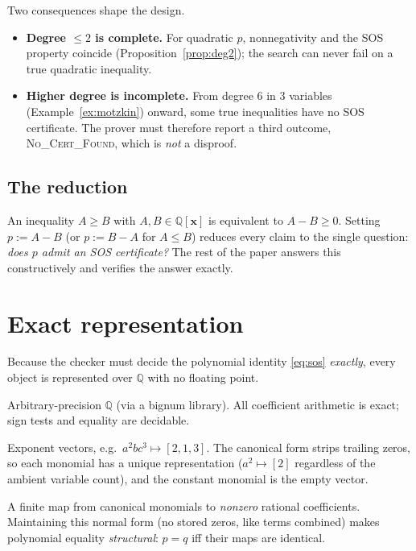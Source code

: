 \documentclass[11pt]{article}
\theoremstyle{definition}
\theoremstyle{plain}
\newcommand{\Q}{\mathbb{Q}}
\newcommand{\x}{\mathbf{x}}
\begin{document}
Two consequences shape the design.
\begin{itemize}[leftmargin=1.4em]
  \item \textbf{Degree $\le 2$ is complete.} For quadratic $p$, nonnegativity
        and the SOS property coincide (Proposition~\ref{prop:deg2}); the search
        can never fail on a true quadratic inequality.
  \item \textbf{Higher degree is incomplete.} From degree $6$ in $3$ variables
        (Example~\ref{ex:motzkin}) onward, some true inequalities have no SOS
        certificate. The prover must therefore report a third outcome,
        \textsc{No\_Cert\_Found}, which is \emph{not} a disproof.
\end{itemize}

\subsection{The reduction}

An inequality $A \ge B$ with $A,B \in \Q[\x]$ is equivalent to $A - B \ge 0$.
Setting $p := A - B$ (or $p := B - A$ for $A \le B$) reduces every claim to the
single question: \emph{does $p$ admit an SOS certificate?} The rest of the paper
answers this constructively and verifies the answer exactly.

\section{Exact representation}
\label{sec:representation}

Because the checker must decide the polynomial identity \eqref{eq:sos}
\emph{exactly}, every object is represented over $\Q$ with no floating point.

\begin{description}[leftmargin=0pt,style=nextline]
  \item[Rationals.] Arbitrary-precision $\Q$ (via a bignum library). All
    coefficient arithmetic is exact; sign tests and equality are decidable.
  \item[Monomials.] Exponent vectors, e.g.\ $a^2 b c^3 \mapsto [2,1,3]$. The
    canonical form strips trailing zeros, so each monomial has a unique
    representation ($a^2 \mapsto [2]$ regardless of the ambient variable count),
    and the constant monomial is the empty vector.
  \item[Polynomials.] A finite map from canonical monomials to \emph{nonzero}
    rational coefficients. Maintaining this normal form (no stored zeros, like
    terms combined) makes polynomial equality \emph{structural}: $p = q$ iff
    their maps are identical.
\end{description}
\end{document}
